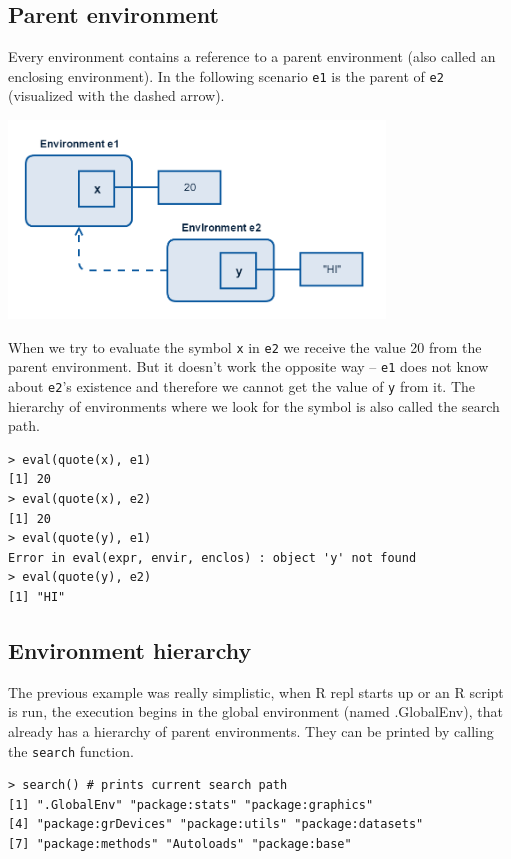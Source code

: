 \documentclass[thesis=B,english]{FITthesis}[2012/10/20]
\begin{document}
\subsection{Parent environment}
Every environment contains a reference to a parent environment (also called an enclosing environment). In the following scenario \verb|e1| is the parent of \verb|e2| (visualized with the dashed arrow).


\includegraphics[width=0.75\textwidth]{img/parent-env.png}


When we try to evaluate the symbol \verb|x| in \verb|e2| we receive the value 20 from the parent environment. But it doesn’t work the opposite way – \verb|e1| does not know about \verb|e2|’s existence and therefore we cannot get the value of \verb|y| from it. The hierarchy of environments where we look for the symbol is also called the search path.

\begin{verbatim}
> eval(quote(x), e1)
[1] 20
> eval(quote(x), e2)
[1] 20
> eval(quote(y), e1)
Error in eval(expr, envir, enclos) : object 'y' not found
> eval(quote(y), e2)
[1] "HI"
\end{verbatim}

\subsection{Environment hierarchy}
The previous example was really simplistic, when R repl starts up or an R script is run, the execution begins in the global environment (named .GlobalEnv), that already has a hierarchy of parent environments. They can be printed by calling the \verb|search| function.

\begin{verbatim}
> search() # prints current search path
[1] ".GlobalEnv" "package:stats" "package:graphics"
[4] "package:grDevices" "package:utils" "package:datasets"
[7] "package:methods" "Autoloads" "package:base"
\end{verbatim}
\end{document}

